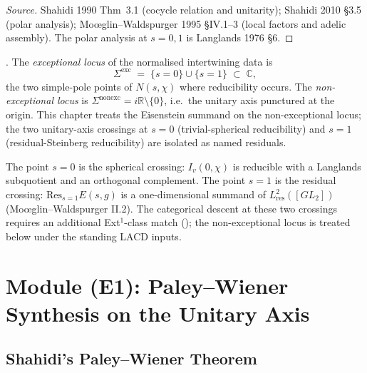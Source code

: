 \begin{proof}[Source]
Shahidi 1990 Thm~3.1 (cocycle relation and unitarity); Shahidi
2010 \S 3.5 (polar analysis); Mo{\oe}glin--Waldspurger 1995 \S IV.1--3
(local factors and adelic assembly). The polar analysis at
\(s=0,1\) is Langlands 1976 \S 6.
\end{proof}

\begin{definition}
\label{v4-arith:w6-d:def:exceptional}
\ClaimStatusDefinitional. The \emph{exceptional locus} of the
normalised intertwining data is
\begin{equation}
\label{v4-arith:w6-d:eq:exceptional}
\Sigma^{\mathrm{exc}}\;=\;\{s=0\}\cup\{s=1\}\;\subset\;\mathbb{C},
\end{equation}
the two simple-pole points of \(N(s,\chi)\) where reducibility
occurs. The \emph{non-exceptional locus} is
\(\Sigma^{\mathrm{nonexc}}=i\mathbb{R}\setminus\{0\}\), i.e.\ the
unitary axis punctured at the origin. This chapter treats the
Eisenstein summand on the non-exceptional locus; the two
unitary-axis crossings at \(s=0\) (trivial-spherical reducibility)
and \(s=1\) (residual-Steinberg reducibility) are isolated as named
residuals.
\end{definition}

\begin{remark}
\label{v4-arith:w6-d:rem:exceptional-form}
The point \(s=0\) is the spherical crossing: \(I_{v}(0,\chi)\) is
reducible with a Langlands subquotient and an orthogonal
complement. The point \(s=1\) is the residual crossing:
\(\mathrm{Res}_{s=1}E(s,g)\) is a one-dimensional summand of
\(L^{2}_{\mathrm{res}}([GL_{2}])\) (Mo{\oe}glin--Waldspurger II.2).
The categorical descent at these two crossings requires an
additional Ext\({}^{1}\)-class match
(); the
non-exceptional locus is treated below under the standing LACD inputs.
\end{remark}

\section{Module (E1): Paley--Wiener Synthesis on the Unitary Axis}
\label{v4-arith:w6-d:E1}

\subsection{Shahidi's Paley--Wiener Theorem}


